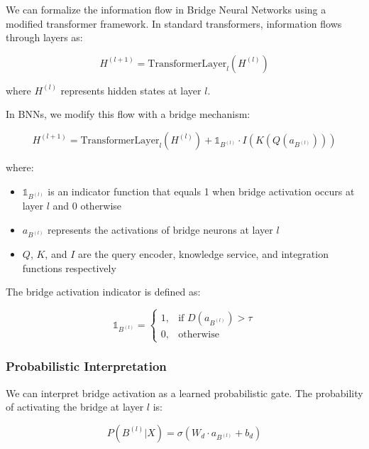 \documentclass[9pt,a4paper,twocolumn,twoside]{tau-class/tau}
\begin{document}
    We can formalize the information flow in Bridge Neural Networks using a modified transformer framework. In standard transformers, information flows through layers as:

    \begin{equation}
        H^{(l+1)} = \text{TransformerLayer}_l(H^{(l)})
    \end{equation}

    where $H^{(l)}$ represents hidden states at layer $l$. 

    In BNNs, we modify this flow with a bridge mechanism:

    \begin{equation}
        H^{(l+1)} = \text{TransformerLayer}_l(H^{(l)}) + \mathbb{1}_{B^{(l)}} \cdot I(K(Q(a_{B^{(l)}})))
    \end{equation}

    where:
    \begin{itemize}
        \item $\mathbb{1}_{B^{(l)}}$ is an indicator function that equals 1 when bridge activation occurs at layer $l$ and 0 otherwise
        \item $a_{B^{(l)}}$ represents the activations of bridge neurons at layer $l$
        \item $Q$, $K$, and $I$ are the query encoder, knowledge service, and integration functions respectively
    \end{itemize}

    The bridge activation indicator is defined as:

    \begin{equation}
        \mathbb{1}_{B^{(l)}} = \begin{cases} 
            1, & \text{if } D(a_{B^{(l)}}) > \tau \\
            0, & \text{otherwise}
        \end{cases}
    \end{equation}

\subsubsection{Probabilistic Interpretation}

    We can interpret bridge activation as a learned probabilistic gate. The probability of activating the bridge at layer $l$ is:

    \begin{equation}
        P(B^{(l)} | X) = \sigma(W_d \cdot a_{B^{(l)}} + b_d)
    \end{equation}
\end{document}
